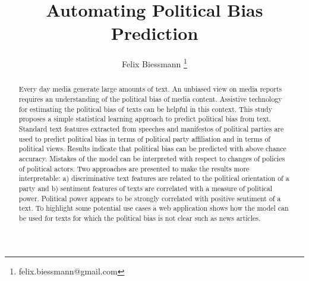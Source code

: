 \documentclass[runningheads,a4paper]{llncs}
\begin{document}
\mainmatter  %

\title{Automating Political Bias Prediction}


%
%
\author{
Felix Biessmann
\thanks{felix.biessmann@gmail.com}
%
}


%
%

\tocauthor{}
\maketitle

\begin{abstract} 
Every day media generate large amounts of text. An unbiased view on media reports requires an understanding of the political bias of media content. Assistive technology for estimating the political bias of texts can be helpful in this context. This study proposes a simple statistical learning approach to predict political bias from text. Standard text features extracted from speeches and manifestos of political parties are used to predict political bias in terms of political party affiliation and in terms of political views. Results indicate that political bias can be predicted with above chance accuracy. Mistakes of the model can be interpreted with respect to changes of policies of political actors. Two approaches are presented to make the results more interpretable: a) discriminative text features are related to the political orientation of a party and b) sentiment features of texts are correlated with a measure of political power. Political power appears to be strongly correlated with positive sentiment of a text. To highlight some potential use cases a web application shows how the model can be used for texts for which the political bias is not clear such as news articles.
\end{abstract} 
\end{document}
